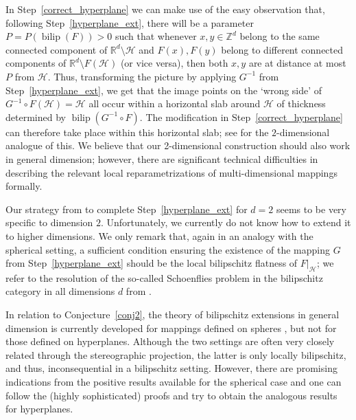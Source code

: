 \documentclass[a4paper, bibliography=totoc]{scrartcl}
\numberwithin{claimcounter}{define}
\newcommand{\R}{\mathbb{R}}
\newcommand{\Z}{\mathbb{Z}}
\newcommand{\rest}[2]{#1|_{#2}} %
\newcommand{\bilip}{\operatorname{bilip}}
\newcommand{\mc}[1]{\mathcal{#1}}
\newcommand{\br}[1]{\left(#1\right)}
\begin{document}
In Step~\eqref{correct_hyperplane} we can make use of the easy observation that, following Step~\eqref{hyperplane_ext}, there will be a parameter $P=P(\bilip(F))>0$ such that whenever $x,y\in \Z^d$ belong to the same connected component of $\R^d\setminus \mc{H}$ and $F(x), F(y)$ belong to different connected components of $\R^d\setminus F\br{\mc{H}}$ (or vice versa), then both $x, y$ are at distance at most $P$ from $\mc{H}$. Thus, transforming the picture by applying $G^{-1}$ from Step~\eqref{hyperplane_ext}, we get that the image points on the `wrong side' of $G^{-1}\circ F(\mc{H})=\mc{H}$ all occur within a horizontal slab around $\mc{H}$ of thickness determined by $\bilip(G^{-1}\circ F)$. The modification in Step~\eqref{correct_hyperplane} can therefore take place within this horizontal slab; see \cite[Theorem~7.1]{DK_2dim} for the $2$-dimensional analogue of this.
We believe that our 2-dimensional construction should also work in general dimension; however, there are significant technical difficulties in describing the relevant local reparametrizations of multi-dimensional mappings formally.



Our strategy from \cite[Sec.~4]{DK_2dim} to complete Step~\eqref{hyperplane_ext} for $d=2$ seems to be very specific to dimension $2$. Unfortunately, we currently do not know how to extend it to higher dimensions. We only remark that, again in an analogy with the spherical setting, a sufficient condition ensuring the existence of the mapping $G$ from Step~\eqref{hyperplane_ext} should be the local bilipschitz flatness of $\rest{F}{\mc{H}}$; we refer to the resolution of the so-called Schoenflies problem in the bilipschitz category in all dimensions $d$ from \cite[Thm.~7.8]{Elems_of_Lip_topology}.
 

In relation to Conjecture~\ref{conj2}, the theory of bilipschitz extensions in general dimension is currently developed for mappings defined on spheres \cite{Sullivan, Tukia_Vaisala-approx_and_extend, Elems_of_Lip_topology}, but not for those defined on hyperplanes. Although the two settings are often very closely related through the stereographic projection, the latter is only locally bilipschitz, and thus, inconsequential in a bilipschitz setting. However, there are promising indications from the positive results available for the spherical case and one can follow the (highly sophisticated) proofs and try to obtain the analogous results for hyperplanes.
\end{document}
